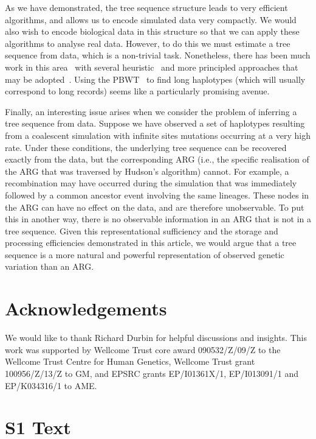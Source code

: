 \documentclass[10pt,letterpaper]{article}
\begin{document}
As we have demonstrated, the tree sequence structure leads to very efficient
algorithms, and allows us to encode simulated data very compactly. We would
also wish to encode biological data in this structure so that we can apply these
algorithms to analyse real data. However, to do this we must estimate a tree
sequence from data, which is a non-trivial task. Nonetheless, there has been
much work in this area~\citep{g14} with several heuristic~\citep{md06} and more
principled approaches that may be adopted~\citep{f13,rhgs14}. Using the
PBWT~\citep{d14} to find long haplotypes (which will usually correspond to long
records) seems like a particularly promising avenue.

Finally, an interesting issue arises when we consider the problem of inferring
a tree sequence from data. Suppose we have observed a set of haplotypes
resulting from a coalescent simulation with infinite sites mutations occurring
at a very high rate. Under these conditions, the underlying tree sequence can
be recovered exactly from the data, but the corresponding ARG (i.e., the
specific realisation of the ARG that was traversed by Hudson's algorithm)
cannot. For example, a recombination may have occurred during the simulation
that was immediately followed by a common ancestor event involving the same
lineages. These nodes in the ARG can have no effect on the data, and are
therefore unobservable. To put this in another way, there is no observable
information in an ARG that is not in a tree sequence. Given this
representational sufficiency and the storage and processing efficiencies
demonstrated in this article, we would argue that a tree sequence is a more
natural and powerful representation of observed genetic variation than an ARG.

\section*{Acknowledgements}
We would like to thank Richard Durbin for helpful discussions and insights.
This work was supported by Wellcome Trust core award 090532/Z/09/Z to the Wellcome
Trust Centre for Human Genetics, Wellcome Trust grant 100956/Z/13/Z to GM,
and EPSRC grants EP/I01361X/1, EP/I013091/1 and EP/K034316/1 to AME.



\clearpage

\section*{S1 Text}
\label{app-algorithm-listing}
\end{document}
